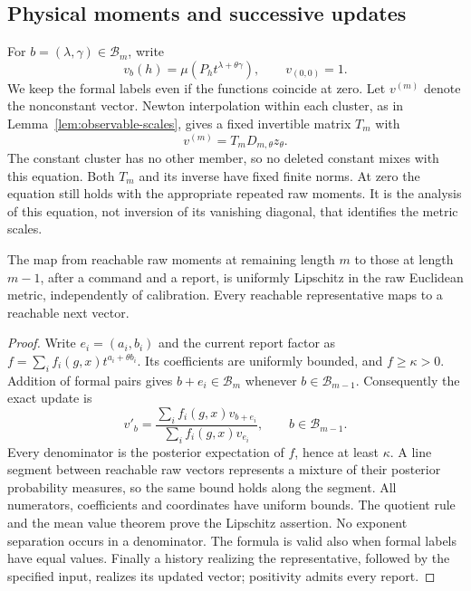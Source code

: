 \subsection{Physical moments and successive updates}
For $b=(\lambda,\gamma)\in\mathcal B_m$, write
\[
 v_b(h)=\mu(P_h t^{\lambda+\theta\gamma}),\qquad v_{(0,0)}=1.
\]
We keep the formal labels even if the functions coincide at zero.
Let $v^{(m)}$ denote the nonconstant vector. Newton interpolation within
each cluster, as in Lemma~\ref{lem:observable-scales}, gives a fixed
invertible matrix $T_m$ with
\begin{equation}\label{eq:raw-versus-scaled}
 v^{(m)}=T_mD_{m,\theta}z_\theta.
\end{equation}
The constant cluster has no other member, so no deleted constant mixes
with this equation. Both $T_m$ and its inverse have fixed finite norms.
At zero the equation still holds with the appropriate repeated raw
moments. It is the analysis of this equation, not inversion of its
vanishing diagonal, that identifies the metric scales.

\begin{lemma}\label{lem:raw-uniform-update}
The map from reachable raw moments at remaining length $m$ to those at
length $m-1$, after a command and a report, is uniformly Lipschitz in
the raw Euclidean metric, independently of calibration. Every reachable
representative maps to a reachable next vector.
\end{lemma}
\begin{proof}
Write $e_i=(a_i,b_i)$ and the current report factor as
$f=\sum_i f_i(g,x)t^{a_i+\theta b_i}$. Its coefficients are uniformly
bounded, and $f\ge\kappa>0$. Addition of formal pairs gives
$b+e_i\in\mathcal B_m$ whenever $b\in\mathcal B_{m-1}$.
Consequently the exact update is
\begin{equation}\label{eq:raw-causal-update}
 v'_b=\frac{\sum_i f_i(g,x)v_{b+e_i}}
                  {\sum_i f_i(g,x)v_{e_i}},
       \qquad b\in\mathcal B_{m-1}.
\end{equation}
Every denominator is the posterior expectation of $f$, hence at least
$\kappa$. A line segment between reachable raw vectors represents a
mixture of their posterior probability measures, so the same bound holds
along the segment. All numerators, coefficients and coordinates have
uniform bounds. The quotient rule and the mean value theorem prove the
Lipschitz assertion. No exponent separation occurs in a denominator.
The formula is valid also when formal labels have equal values. Finally
a history realizing the representative, followed by the specified input,
realizes its updated vector; positivity admits every report.
\end{proof}


